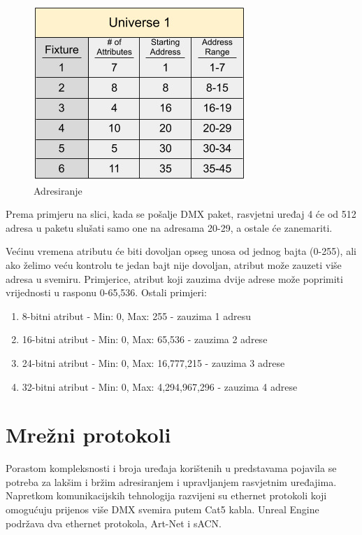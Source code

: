 \documentclass[times, utf8, zavrsni, numeric]{fer}
\begin{document}
\begin{figure}[htp]
	\centering
	\includegraphics[width=\linewidth]{slika 3-2.png}
	\caption{Adresiranje \cite{dmx_overview}}
	\label{fig:slika 3-2}
\end{figure}

Prema primjeru na slici, kada se pošalje DMX paket, rasvjetni uređaj 4 će od 512 adresa u paketu slušati samo one na adresama 20-29, a ostale će zanemariti. \newline

Većinu vremena atributu će biti dovoljan opseg unosa od jednog bajta (0-255), ali ako želimo veću kontrolu te jedan bajt nije dovoljan, atribut može zauzeti više adresa u svemiru. Primjerice, atribut koji zauzima dvije adrese može poprimiti vrijednosti u rasponu 0-65,536. Ostali primjeri:

\begin{enumerate}
	\item 8-bitni atribut - Min: 0, Max: 255 - zauzima 1 adresu
	\item 16-bitni atribut - Min: 0, Max: 65,536 - zauzima 2 adrese
	\item 24-bitni atribut - Min: 0, Max: 16,777,215  - zauzima 3 adrese
	\item 32-bitni atribut - Min: 0, Max: 4,294,967,296  - zauzima 4 adrese
\end{enumerate}

\section{Mrežni protokoli}
Porastom kompleksnosti i broja uređaja korištenih u predstavama pojavila se potreba za lakšim i bržim adresiranjem i upravljanjem rasvjetnim uređajima. Napretkom komunikacijskih tehnologija razvijeni su ethernet protokoli koji omogućuju prijenos više DMX svemira putem Cat5 kabla. Unreal Engine podržava dva ethernet protokola, Art-Net i sACN.
\end{document}

